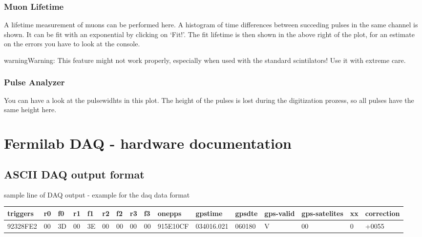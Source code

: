 \documentclass[letterpaper,10pt,english]{sphinxmanual}
\begin{document}
\subsubsection{Muon Lifetime}
\label{tutorial:muon-lifetime}
A lifetime measurement of muons can be performed here. A histogram of time differences between succeding pulses in the same channel is shown. It can be fit with an exponential by clicking on `Fit!'. The fit lifetime is then shown in the above right of the plot, for an estimate on the errors you have to look at the console.

\begin{notice}{warning}{Warning:}
This feature might not work properly, especially when used with the standard scintilators! Use it with extreme care.
\end{notice}


\subsubsection{Pulse Analyzer}
\label{tutorial:pulse-analyzer}
You can have a look at the pulsewidhts in this plot. The height of the pulses is lost during the digitization prozess, so all pulses have the same height here.


\section{Fermilab DAQ - hardware documentation}
\label{hardware:fermilab-daq-hardware-documentation}\label{hardware::doc}

\subsection{ASCII DAQ output format}
\label{hardware:ascii-daq-output-format}
sample line of DAQ output - example for the daq data format

\begin{tabulary}{\linewidth}{|L|L|L|L|L|L|L|L|L|L|L|L|L|L|L|L|}
\hline
\textbf{
triggers
} & \textbf{
r0
} & \textbf{
f0
} & \textbf{
r1
} & \textbf{
f1
} & \textbf{
r2
} & \textbf{
f2
} & \textbf{
r3
} & \textbf{
f3
} & \textbf{
onepps
} & \textbf{
gpstime
} & \textbf{
gpsdte
} & \textbf{
gps-valid
} & \textbf{
gps-satelites
} & \textbf{
xx
} & \textbf{
correction
}\\\hline

92328FE2
 & 
00
 & 
3D
 & 
00
 & 
3E
 & 
00
 & 
00
 & 
00
 & 
00
 & 
915E10CF
 & 
034016.021
 & 
060180
 & 
V
 & 
00
 & 
0
 & 
+0055
\\\hline
\end{tabulary}
\end{document}
